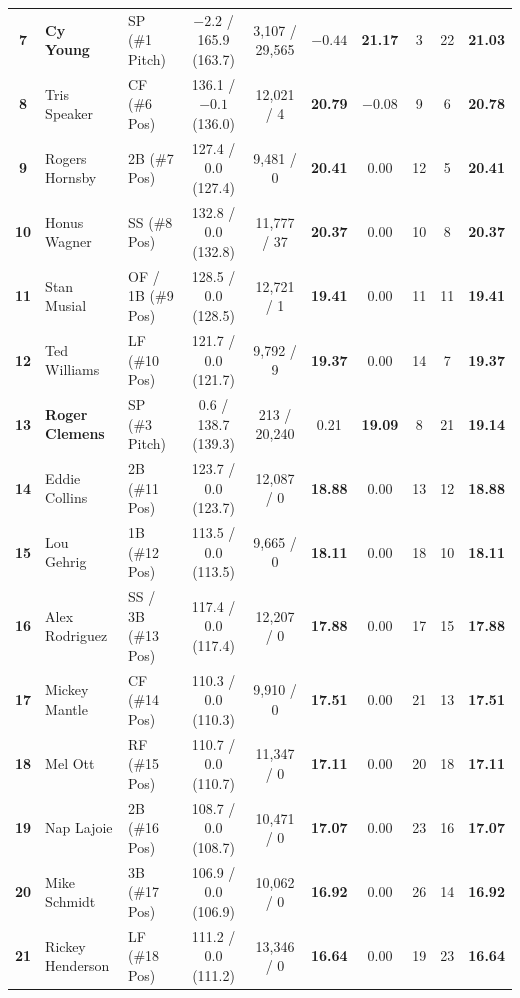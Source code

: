 \documentclass[11pt,letterpaper]{article}
\theoremstyle{plain}
\theoremstyle{definition}
\theoremstyle{remark}
\begin{document}
\begin{table}[htbp]
{\begin{tabular}{@{}cllccccccc@{}}
\textbf{7} & \textbf{Cy Young} & SP (\#1 Pitch) & $-2.2$ / 165.9 (163.7) & 3,107 / 29,565 & $-0.44$ & \textbf{21.17} & 3 & 22 & \textbf{21.03} \\
\textbf{8} & Tris Speaker & CF (\#6 Pos) & 136.1 / $-0.1$ (136.0) & 12,021 / 4 & \textbf{20.79} & $-0.08$ & 9 & 6 & \textbf{20.78} \\
\textbf{9} & Rogers Hornsby & 2B (\#7 Pos) & 127.4 / 0.0 (127.4) & 9,481 / 0 & \textbf{20.41} & 0.00 & 12 & 5 & \textbf{20.41} \\
\textbf{10} & Honus Wagner & SS (\#8 Pos) & 132.8 / 0.0 (132.8) & 11,777 / 37 & \textbf{20.37} & 0.00 & 10 & 8 & \textbf{20.37} \\
\textbf{11} & Stan Musial & OF / 1B (\#9 Pos) & 128.5 / 0.0 (128.5) & 12,721 / 1 & \textbf{19.41} & 0.00 & 11 & 11 & \textbf{19.41} \\
\textbf{12} & Ted Williams & LF (\#10 Pos) & 121.7 / 0.0 (121.7) & 9,792 / 9 & \textbf{19.37} & 0.00 & 14 & 7 & \textbf{19.37} \\
\textbf{13} & \textbf{Roger Clemens} & SP (\#3 Pitch) & 0.6 / 138.7 (139.3) & 213 / 20,240 & 0.21 & \textbf{19.09} & 8 & 21 & \textbf{19.14} \\
\textbf{14} & Eddie Collins & 2B (\#11 Pos) & 123.7 / 0.0 (123.7) & 12,087 / 0 & \textbf{18.88} & 0.00 & 13 & 12 & \textbf{18.88} \\
\textbf{15} & Lou Gehrig & 1B (\#12 Pos) & 113.5 / 0.0 (113.5) & 9,665 / 0 & \textbf{18.11} & 0.00 & 18 & 10 & \textbf{18.11} \\
\textbf{16} & Alex Rodriguez & SS / 3B (\#13 Pos) & 117.4 / 0.0 (117.4) & 12,207 / 0 & \textbf{17.88} & 0.00 & 17 & 15 & \textbf{17.88} \\
\textbf{17} & Mickey Mantle & CF (\#14 Pos) & 110.3 / 0.0 (110.3) & 9,910 / 0 & \textbf{17.51} & 0.00 & 21 & 13 & \textbf{17.51} \\
\textbf{18} & Mel Ott & RF (\#15 Pos) & 110.7 / 0.0 (110.7) & 11,347 / 0 & \textbf{17.11} & 0.00 & 20 & 18 & \textbf{17.11} \\
\textbf{19} & Nap Lajoie & 2B (\#16 Pos) & 108.7 / 0.0 (108.7) & 10,471 / 0 & \textbf{17.07} & 0.00 & 23 & 16 & \textbf{17.07} \\
\textbf{20} & Mike Schmidt & 3B (\#17 Pos) & 106.9 / 0.0 (106.9) & 10,062 / 0 & \textbf{16.92} & 0.00 & 26 & 14 & \textbf{16.92} \\
\textbf{21} & Rickey Henderson & LF (\#18 Pos) & 111.2 / 0.0 (111.2) & 13,346 / 0 & \textbf{16.64} & 0.00 & 19 & 23 & \textbf{16.64} \\

\end{tabular}}
\end{table}
\end{document}
